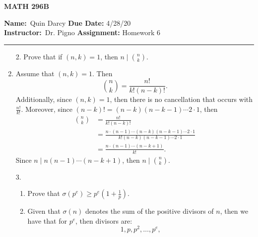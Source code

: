 \documentclass[12pt]{article}
\makeatletter
\theoremstyle{definition}
\theoremstyle{remark}
\renewenvironment{proof}[1][\proofname]{\par
  \pushQED{\qed}%
  \normalfont \topsep6\p@\@plus6\p@\relax
  \list{}{\leftmargin=0mm
          \rightmargin=4mm
          \settowidth{\itemindent}{\itshape#1}%
          \labelwidth=\itemindent
          \parsep=0pt \listparindent=\parindent 
  }
  \item[\hskip\labelsep
        \itshape
    #1\@addpunct{.}]\ignorespaces
}{%
  \popQED\endlist\@endpefalse
}
\let\oldproofname=\proofname
\renewcommand{\proofname}{\bf{\textit{\oldproofname}}}
\makeatother
\begin{document}
\thispagestyle{empty}\hline

\begin{center}
	\vspace{.4cm} {\textbf { \large MATH 296B}}
\end{center}
{\textbf{Name:}\ Quin Darcy \hspace{\fill} \textbf{Due Date:} 4/28/20   \\
{ \textbf{Instructor:}}\ Dr. Pigno \hspace{\fill} \textbf{Assignment:} Homework 6 \\ \hrule}

\justifying

    \begin{enumerate}[leftmargin=*]
        \item[2.] Prove that if $(n,k)=1$, then $n\mid\binom{n}{k}$.
            \begin{proof}
                Assume that $(n,k)=1$. Then 
                    \[
                        \binom{n}{k}=\frac{n!}{k!(n-k)!}.
                    \]
                Additionally, since $(n,k)=1$, then there is no cancellation that occurs with $\frac{n!}{k!}$. Moreover, since $(n-k)!=(n-k)(n-k-1)\cdots2\cdot1$, then 
                    \begin{equation*}
                        \begin{split}
                            \binom{n}{k}&=\frac{n!}{k!(n-k)!}\\&=\frac{n\cdot(n-1)\cdots(n-k)(n-k-1)\cdots2\cdot1}{k!(n-k)(n-k-1)\cdots2\cdot1}\\&=\frac{n\cdot(n-1)\cdots(n-k+1)}{k!}. 
                        \end{split}
                    \end{equation*}
                Since $n\mid n(n-1)\cdots(n-k+1)$, then $n\mid\binom{n}{k}$.
            \end{proof}
        \item[3.]\hfill\par
            \begin{enumerate}
                \item Prove that $\sigma(p^e)\geq p^e(1+\frac{1}{p})$.
                    \begin{proof}
                        Given that $\sigma(n)$ denotes the sum of the positive divisors of $n$, then we have that for $p^e$, then divisors are:
                            \begin{equation*}
                                1, p, p^2,\dots, p^e,

\end{equation*}
\end{proof}
\end{enumerate}
\end{enumerate}
\end{document}
